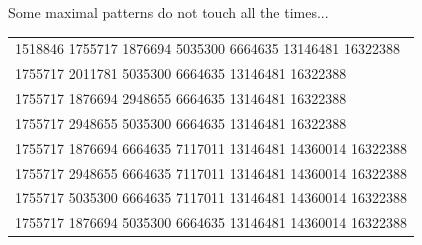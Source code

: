 \documentclass{beamer}
\begin{document}
\begin{frame}{Some maximal patterns do not touch all the times...}
{\begin{tabular}{l}
        \hline
        \rowcolor{lightred} 1518846 1755717 1876694 5035300 6664635 13146481 16322388 \\
        1755717 2011781 5035300 6664635 13146481 16322388 \\
        1755717 1876694 2948655 6664635 13146481 16322388 \\
        1755717 2948655 5035300 6664635 13146481 16322388 \\
        1755717 1876694 6664635 7117011 13146481 14360014 16322388 \\
        1755717 2948655 6664635 7117011 13146481 14360014 16322388 \\
        1755717 5035300 6664635 7117011 13146481 14360014 16322388 \\
        1755717 1876694 5035300 6664635 13146481 14360014 16322388 \\
        \hline
    \end{tabular}
    }
\end{frame}
\end{document}
